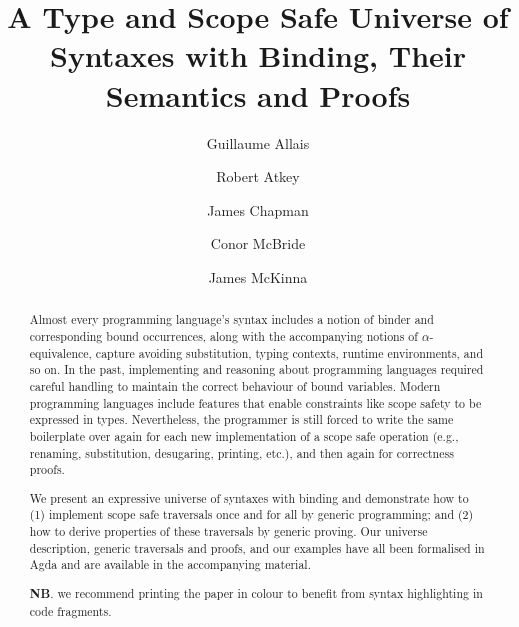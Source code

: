 \documentclass[format=acmsmall, screen=true]{acmart}
\begin{document}
\title[A Type and Scope Safe Universe of Syntaxes with Binding]{A Type and Scope Safe Universe of Syntaxes with Binding, Their Semantics and Proofs}
\author{Guillaume Allais}
\author{Robert Atkey}
\author{James Chapman}
\author{Conor McBride}
\author{James McKinna}

\begin{abstract}
Almost every programming language's syntax includes a notion of binder
and corresponding bound occurrences, along with the accompanying
notions of $\alpha$-equivalence, capture avoiding substitution, typing
contexts, runtime environments, and so on. In the past, implementing
and reasoning about programming languages required careful handling to
maintain the correct behaviour of bound variables. Modern programming
languages include features that enable constraints like scope safety
to be expressed in types. Nevertheless, the programmer is still forced
to write the same boilerplate over again for each new implementation
of a scope safe operation (e.g., renaming, substitution, desugaring,
printing, etc.), and then again for correctness proofs.

We present an expressive universe of syntaxes with binding and
demonstrate how to (1) implement scope safe traversals once and for
all by generic programming; and (2) how to derive properties of these
traversals by generic proving. Our universe description, generic
traversals and proofs, and our examples have all been formalised in
Agda and are available in the accompanying material.

\textbf{NB}. we recommend printing the paper in colour to benefit
from syntax highlighting in code fragments.
\end{abstract}


%
%
\begin{CCSXML}

\end{CCSXML}

\end{document}
